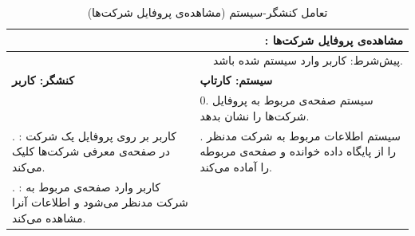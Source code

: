 \documentclass[12pt,svgnames,oneside]{book}
\newcommand{\uc}[1]{\lr{UC{#1}}}
\newcommand{\tucbw}{\lr{TUCBW}}
\newcommand{\tucew}{\lr{TUCEW}}
\newcommand{\actorsystem}[1]{
\textbf{کنشگر: {#1}} &
\textbf{سیستم: کارتاپ} \\
}
\newcommand{\zerostep}[1]{
& 0. {#1} \\
}
\newcounter{UseCaseCounter}
\newcommand{\step}[1]{
\stepcounter{UseCaseCounter}\arabic{UseCaseCounter}. {#1}
}
\newcommand{\ucname}[2]{
\multicolumn{2}{|r|}{\uc{{#1}}: {#2}} \\
}
\newcommand{\preif}[1]{
\multicolumn{2}{|r|}{پیش‌شرط:‌ {#1}} \\
}
\begin{document}
\setcounter{UseCaseCounter}{0}
\begin{table}[H]
\caption{تعامل کنشگر-سیستم  (مشاهده‌ی پروفایل شرکت‌ها)}
\label{table:uc:company-profile}
\begin{center}
\begin{tabular}{|p{}|p{}|}
\hline

\ucname{13}{مشاهده‌ی پروفایل شرکت‌ها}
\hline

\preif{کاربر وارد سیستم شده باشد.}
\hline

\actorsystem{کاربر}
\hline

\zerostep{{\small سیستم صفحه‌ی مربوط به پروفایل شرکت‌ها را نشان بدهد.}}
\hline

\step{{\small \textbf{\tucbw}: کاربر بر روی پروفایل یک شرکت در صفحه‌ی معرفی شرکت‌ها کلیک می‌کند.}} & 
\step{{\small سیستم اطلاعات مربوط به شرکت مدنظر را از پایگاه داده خوانده و صفحه‌ی مربوطه را آماده می‌کند.}} \\
\hline

\step{{\small \textbf{\tucew}: کاربر وارد صفحه‌ی مربوط به شرکت مدنظر می‌شود و اطلاعات آنرا مشاهده می‌کند.}} & 
\\
\hline
\end{tabular}
\end{center}
\end{table}



\end{document}
